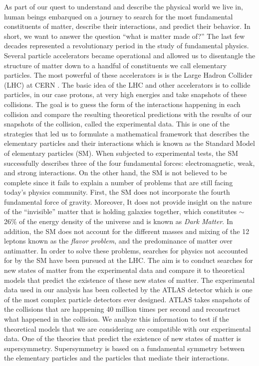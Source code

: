 \documentclass{outhesis}
\begin{document}
As part of our quest to understand and describe the physical world we live in, human beings embarqued on a journey to search for the  most 
fundamental constituents of matter, describe their interactions, and predict their behavior. In short, we want to answer the question 
``what is matter made of?''
The last few decades represented a revolutionary period in the study of fundamental physics.  Several particle accelerators became operational 
and allowed us to disentangle the structure of matter down to a handful of constituents we call elementary particles. The 
most powerful of these accelerators is is the Large Hadron Collider (LHC) at CERN . 
The basic idea of the LHC and other accelerators is to collide particles, 
in our case protons,  at very high energies and take snapshots of these collisions. The goal is to guess the form of the interactions happening 
in each collision and compare the resulting theoretical predictions with the results of our snapshots of the collision, called the experimental data. 
This is one of the strategies that led us to formulate a mathematical framework that describes the elementary particles and their interactions
which is known as the Standard Model of elementary particles (SM). 
When subjected to experimental tests, the SM successfully describes three of the four fundamental forces: electromagnetic, weak, and strong interactions. On the other hand, the SM is not believed to be complete since it fails to explain a number of problems that are still facing today's physics community. First, the SM does not incorporate the fourth fundamental force of gravity. Moreover, It does not provide insight on the nature of the ``invisible'' matter that is holding galaxies together, which constitutes $\sim$ 26\% of the energy density of the universe and is known as \emph{Dark Matter}. In addition, the SM does not account for the different masses and mixing of the 12 leptons
 known as the \emph{flavor problem}, and the predominance of matter over antimatter. In order to solve these problems, searches for physics not accounted for by the SM have been pursued at the LHC. The aim is to conduct 
searches for new states of matter from the experimental data and compare it to theoretical models that predict the existence of these new states of matter.
 The experimental data used in 
our analysis has been collected by the ATLAS detector which is one of the most complex particle detectors ever designed. ATLAS takes snapshots of the 
collisions that are happening 40 million times per second and reconstruct what happened in the collision. We analyze this information to test 
if the theoretical models that we are considering are compatible with our experimental data. One of the theories that predict the existence of 
new states of matter is supersymmetry. Supersymmetry is based on a fundamental symmetry between the elementary particles and the particles that 
mediate their interactions. \\
\end{document}
